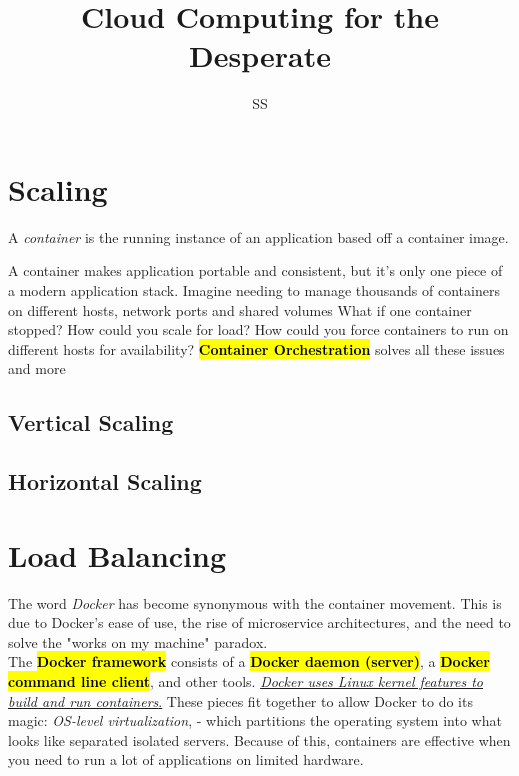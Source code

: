 \documentclass{article}
\title{Cloud Computing for the Desperate}
\author{SS}
\begin{document}
\maketitle


\section{Scaling}
\begin{tcolorbox}[colback=red!5!white, colframe=red!50!black,title=Container ] 
A \textit{container} is the running instance of an application based off a container image.
\end{tcolorbox}
A container makes application portable and consistent, but it's only one piece of a modern application stack. Imagine needing to manage thousands of containers on different hosts, network ports and shared volumes What if one container stopped? How could you scale for load? How could you force containers to run on different hosts for availability? \textbf{\textcolor{red}{\hl{Container Orchestration}}} solves all these issues and more  \\
\subsection{Vertical Scaling}
\subsection{Horizontal Scaling}
\section{Load Balancing}
The word \textit{Docker} has become synonymous with the container movement. This is due to Docker's ease of use, the rise of microservice architectures, and the need to solve the "works on my machine" paradox. \\
The \textbf{\textcolor{red}{\hl{Docker framework}}} consists of a \textbf{\textcolor{red}{\hl{Docker daemon (server)}}}, a \textbf{\textcolor{red}{\hl{Docker command line client}}}, and other tools. \underline{ \textit{Docker uses Linux kernel features to build and run containers}.} These pieces fit together to allow Docker to do its magic: \textit{OS-level virtualization}, - which partitions the operating system into what looks like separated isolated servers. Because of this, containers are effective when you need to run a lot of applications on limited hardware. 
\\
\end{document}
